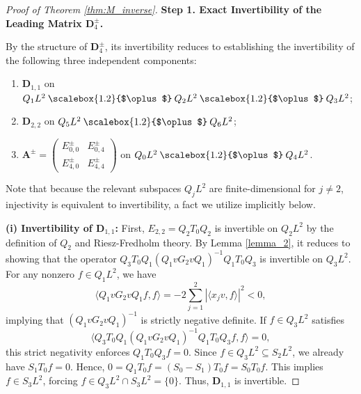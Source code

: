 \documentclass[reqno]{amsart}
\newcommand{\medoplus}
{\mathbin{\scalebox{1.2}{$\oplus$}}}
\numberwithin{equation}{section}
\begin{document}
\begin{proof}[Proof of Theorem \ref{thm:M_inverse}]
{\textbf{Step 1. Exact Invertibility of the Leading Matrix $\mathbf{D}_{4}^{\pm}$.}}

	By the structure of $\mathbf{D}_{4}^{\pm}$, its invertibility reduces to establishing the invertibility of the following three independent components:
	\begin{enumerate}
		\item[(i)] $\mathbf{D}_{1,1}$ on $Q_1 L^2 \medoplus Q_2 L^2 \medoplus Q_3 L^2$;
		\item[(ii)] $\mathbf{D}_{2,2}$ on $Q_5 L^2 \medoplus Q_6 L^2$;
		\item[(iii)] $\mathbf{A}^{\pm} = \begin{pmatrix} E_{0,0}^{\pm} & E_{0,4}^{\pm} \\ E_{4,0}^{\pm} & E_{4,4}^{\pm} \end{pmatrix}$ on $Q_0 L^2 \medoplus Q_4 L^2$.
	\end{enumerate}
Note that because the relevant subspaces $Q_j L^2$ are finite-dimensional for $j \neq  2$, injectivity is equivalent to invertibility, a fact we utilize implicitly below.
	
		\textbf{(i) Invertibility of $\mathbf{D}_{1,1}$:}
	First, $E_{2,2} = Q_2 T_0 Q_2$ is invertible on $Q_2 L^2$ by the definition of $Q_2$ and Riesz-Fredholm theory. By Lemma \ref{lemma_2}, it reduces to showing that the operator $Q_{3} T_0 Q_{1} (Q_{1}v G_{2} v Q_{1})^{-1} Q_{1}T_0 Q_{3}$ is invertible on $Q_{3} L^2$. For any nonzero $f \in Q_1 L^2$, we have
	$$
	\langle Q_1 v G_2 v Q_1 f, f \rangle = -2 \sum_{j=1}^2 |\langle x_j v, f \rangle|^2 < 0,
	$$
	implying that $(Q_1 v G_2 v Q_1)^{-1}$ is strictly negative definite. If $f \in Q_3 L^2$ satisfies $$\langle Q_3 T_0 Q_1 (Q_1 v G_2 v Q_1)^{-1} Q_1 T_0 Q_3 f, f \rangle = 0,$$ this strict negativity enforces $Q_1 T_0 Q_3 f = 0$. Since $f \in Q_3 L^2 \subseteq S_2 L^2$, we already have $S_1 T_0 f = 0$. Hence, $0 = Q_1 T_0 f = (S_0 - S_1) T_0 f = S_0 T_0 f$. This implies $f \in S_3 L^2$, forcing $f \in Q_3 L^2 \cap S_3 L^2 = \{0\}$. Thus, $\mathbf{D}_{1,1}$ is invertible.
	

\end{proof}
\end{document}
